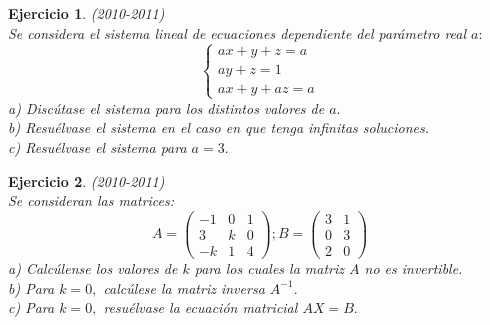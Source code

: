 \documentclass[12pt, a4paper]{amsart}
\newtheorem{ejer}{Ejercicio}
\begin{document}
\begin{ejer}\em (2010-2011)\\
Se considera el sistema lineal de ecuaciones dependiente del parámetro real $a:$
\begin{equation*}
\left \{ \begin{matrix} ax+y+z=a
\\ ay+z=1
\\ ax+y+az=a \end{matrix}\right. 
\end{equation*}
a) Discútase el sistema para los distintos valores de $a.$\\
b) Resuélvase el sistema en el caso en que tenga infinitas soluciones.\\
c) Resuélvase el sistema para $a=3.$
\end{ejer}

\begin{ejer}\em (2010-2011)\\
Se consideran las matrices:
\begin{equation*}
A=\begin{pmatrix}
-1 & 0 & 1
\\ 3 & k & 0
\\ -k & 1 & 4 \end{pmatrix};
B=\begin{pmatrix}
3 & 1
\\ 0 & 3
\\ 2 & 0 \end{pmatrix}
\end{equation*}
a) Calcúlense los valores de $k$ para los cuales la matriz $A$ no es invertible.\\
b) Para $k=0,$ calcúlese la matriz inversa $A^{-1}.$\\
c) Para $k=0,$ resuélvase la ecuación matricial $AX=B.$
\end{ejer}
\end{document}
